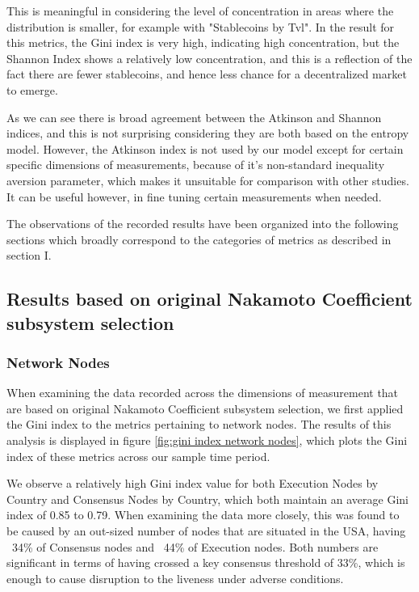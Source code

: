 \documentclass[conference]{IEEEtran}
\begin{document}
This is meaningful in considering the level of concentration in areas where the distribution is smaller, for example with "Stablecoins by Tvl".  In the result for this metrics, the Gini index is very high, indicating high concentration, but the Shannon Index shows a relatively low concentration, and this is a reflection of the fact there are fewer stablecoins, and hence less chance for a decentralized market to emerge.

As we can see there is broad agreement between the Atkinson and Shannon indices, and this is not surprising considering they are both based on the entropy model.  However, the Atkinson index is not used by our model except for certain specific dimensions of measurements, because of it's non-standard inequality aversion parameter, which makes it unsuitable for comparison with other studies. It can be useful however, in fine tuning certain measurements when needed.

The observations of the recorded results have been organized into the following sections which broadly correspond to the categories of metrics as described in section I.

\subsection{Results based on original Nakamoto Coefficient subsystem selection}

\subsubsection{Network Nodes}
When examining the data recorded across the dimensions of measurement that are based on original Nakamoto Coefficient subsystem selection, we first applied the Gini index to the metrics pertaining to network nodes.  The results of this analysis is displayed in figure \ref{fig:gini index network nodes}, which plots the Gini index of these metrics across our sample time period.

We observe a relatively high Gini index value for both Execution Nodes by Country and Consensus Nodes by Country, which both maintain an average Gini index of 0.85 to 0.79.  When examining the data more closely, this was found to be caused by an out-sized number of nodes that are situated in the USA, having  ~34\% of Consensus nodes and ~44\% of Execution nodes.  Both numbers are significant in terms of having crossed a key consensus threshold of 33\%, which is enough to cause disruption to the liveness under adverse conditions.
\end{document}
